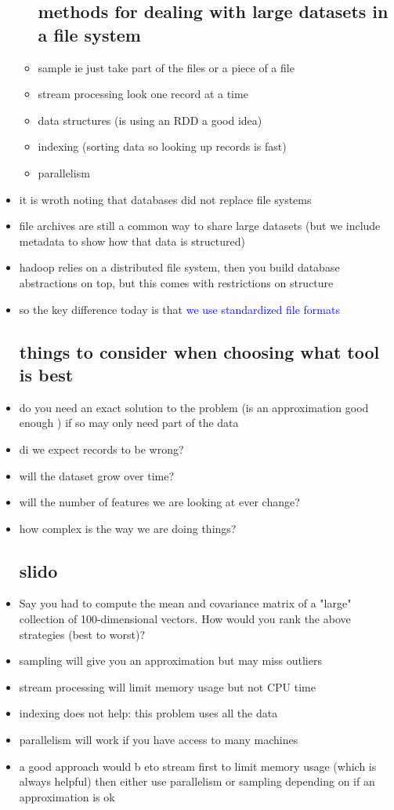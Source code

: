 \documentclass{article}
\begin{document}
\begin{itemize}
\begin{itemize}
\subsection*{methods for dealing with large datasets in a file system}
\item sample ie just take part of the files or a piece of a file 
\item stream processing look one record at a time 
\item data structures (is using an RDD a good idea)
\item indexing (sorting data so looking up records is fast)
\item parallelism 
\end{itemize}
\item it is wroth noting that databases did not replace file systems 
\item file archives are still a common way to share large datasets (but we include metadata to show how that data is structured)
\item hadoop relies on a distributed file system, then you build database abstractions on top, but this comes with restrictions on structure 
\item so the key difference today is that \textcolor{blue}{ we use standardized file formats}
\subsection*{things to consider when choosing what tool is best }
\item do you need an exact solution to the problem (is an approximation good enough ) if so may only need part of the data
\item di we expect records to be wrong?
\item will the dataset grow over time?
\item will the number of features we are looking at ever change?
\item how complex is the way we are doing things?
\subsection*{slido}
\item Say you had to compute the mean and
covariance matrix of a "large" collection of
100-dimensional vectors. How would you
rank the above strategies (best to
worst)?
\item sampling will give you an approximation but may miss outliers
\item stream processing will limit memory usage but not CPU time 
\item indexing does not help: this problem uses all the data 
\item parallelism will work if you have access to many machines 
\item a good approach would b eto stream first to limit memory usage (which is always helpful) then either use parallelism or sampling depending on if an approximation is ok 

\end{itemize}
\end{document}
